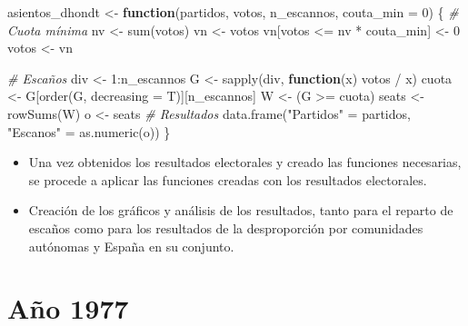 \documentclass[12pt,a4paper,]{book}
\newenvironment{Shaded}{\begin{snugshade}}{\end{snugshade}}
\newcommand{\AttributeTok}[1]{\textcolor[rgb]{0.77,0.63,0.00}{#1}}
\newcommand{\CommentTok}[1]{\textcolor[rgb]{0.56,0.35,0.01}{\textit{#1}}}
\newcommand{\ControlFlowTok}[1]{\textcolor[rgb]{0.13,0.29,0.53}{\textbf{#1}}}
\newcommand{\DecValTok}[1]{\textcolor[rgb]{0.00,0.00,0.81}{#1}}
\newcommand{\FunctionTok}[1]{\textcolor[rgb]{0.00,0.00,0.00}{#1}}
\newcommand{\NormalTok}[1]{#1}
\newcommand{\OtherTok}[1]{\textcolor[rgb]{0.56,0.35,0.01}{#1}}
\newcommand{\SpecialCharTok}[1]{\textcolor[rgb]{0.00,0.00,0.00}{#1}}
\newcommand{\StringTok}[1]{\textcolor[rgb]{0.31,0.60,0.02}{#1}}
\numberwithin{dummy}{section}
\theoremstyle{ocrenumbox}
\theoremstyle{blacknumex}
\theoremstyle{blacknumbox}
\theoremstyle{ocrenum}
\theoremstyle{ocrenum}
\begin{document}
\pagebreak

\begin{Shaded}
\begin{Highlighting}[]
\NormalTok{asientos\_dhondt }\OtherTok{\textless{}{-}} \ControlFlowTok{function}\NormalTok{(partidos, votos,}
\NormalTok{                            n\_escannos,}
                            \AttributeTok{couta\_min =} \DecValTok{0}\NormalTok{) \{}
  \CommentTok{\# Cuota mínima}
\NormalTok{  nv }\OtherTok{\textless{}{-}} \FunctionTok{sum}\NormalTok{(votos)}
\NormalTok{  vn }\OtherTok{\textless{}{-}}\NormalTok{ votos}
\NormalTok{  vn[votos }\SpecialCharTok{\textless{}=}\NormalTok{ nv }\SpecialCharTok{*}\NormalTok{ couta\_min] }\OtherTok{\textless{}{-}} \DecValTok{0}
\NormalTok{  votos }\OtherTok{\textless{}{-}}\NormalTok{ vn}

  \CommentTok{\# Escaños}
\NormalTok{  div }\OtherTok{\textless{}{-}} \DecValTok{1}\SpecialCharTok{:}\NormalTok{n\_escannos}
\NormalTok{  G }\OtherTok{\textless{}{-}} \FunctionTok{sapply}\NormalTok{(div, }\ControlFlowTok{function}\NormalTok{(x) votos }\SpecialCharTok{/}\NormalTok{ x)}
\NormalTok{  cuota }\OtherTok{\textless{}{-}}\NormalTok{ G[}\FunctionTok{order}\NormalTok{(G, }\AttributeTok{decreasing =}\NormalTok{ T)][n\_escannos]}
\NormalTok{  W }\OtherTok{\textless{}{-}}\NormalTok{ (G }\SpecialCharTok{\textgreater{}=}\NormalTok{ cuota)}
\NormalTok{  seats }\OtherTok{\textless{}{-}} \FunctionTok{rowSums}\NormalTok{(W)}
\NormalTok{  o }\OtherTok{\textless{}{-}}\NormalTok{ seats}
  \CommentTok{\# Resultados}
  \FunctionTok{data.frame}\NormalTok{(}\StringTok{"Partidos"} \OtherTok{=}\NormalTok{ partidos, }\StringTok{"Escanos"} \OtherTok{=} \FunctionTok{as.numeric}\NormalTok{(o))}
\NormalTok{\}}
\end{Highlighting}
\end{Shaded}

\begin{itemize}
\item
  Una vez obtenidos los resultados electorales y creado las funciones
  necesarias, se procede a aplicar las funciones creadas con los
  resultados electorales.
\item
  Creación de los gráficos y análisis de los resultados, tanto para el
  reparto de escaños como para los resultados de la desproporción por
  comunidades autónomas y España en su conjunto.
\end{itemize}

\newpage

\hypertarget{auxf1o-1977}{%
\section{Año 1977}\label{auxf1o-1977}}
\end{document}
